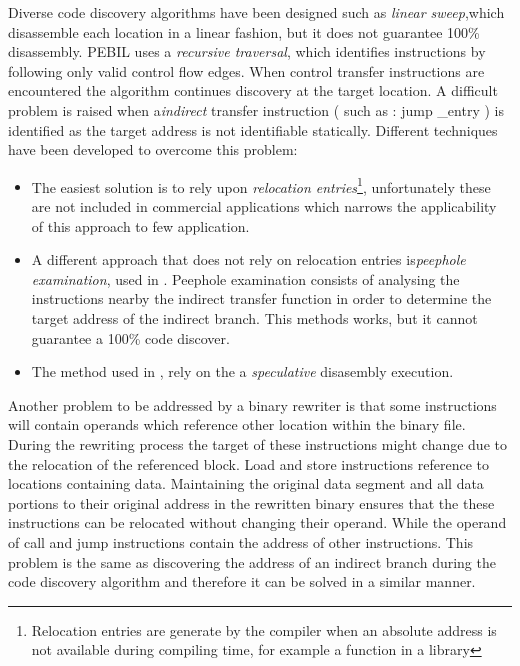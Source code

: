 Diverse code discovery algorithms have been designed \cite{SECONDWRITER , codediscovery} such as \emph{linear sweep},which disassemble each location in a linear fashion, but it does not guarantee 100\% disassembly. PEBIL uses a \emph{recursive traversal}, which identifies instructions by following only valid control flow edges. When control transfer instructions are encountered the algorithm continues discovery at the target location. A difficult problem is raised when a\emph{indirect} transfer instruction  ( such as : jump \_entry ) is identified as the target address is not identifiable statically. Different techniques have been developed to overcome this problem: 
\begin{itemize}
\item The easiest solution is to rely upon \emph{relocation entries}\footnote{Relocation entries are generate by the compiler when an absolute address is not available during compiling time, for example a function in a library}, unfortunately these are not included in commercial applications which narrows the applicability of this approach to few application. %

\item A different approach that does not rely on relocation entries is\emph{peephole examination},  used  in \cite{PEBIL}. Peephole examination consists of analysing the instructions nearby the indirect transfer function  in order to determine the target address of the indirect branch. This methods works, but it cannot guarantee a 100\% code discover. 

\item The method used in \cite{SECONDWRITER}, rely on the a \emph{speculative} disasembly execution.  
\end{itemize}       

Another problem to be addressed by a binary rewriter is that some instructions will contain operands which reference other location within the binary file. During the rewriting process the target of these instructions might change due to the relocation of the referenced block. Load and store instructions reference to locations containing data. Maintaining the original data segment and all data portions to their original address in the rewritten binary ensures that the these instructions can be relocated without changing their operand. While the operand of call and jump instructions contain the address of other instructions. This problem is the same as discovering the address of an indirect branch during the code discovery algorithm and therefore it can be solved in a similar manner.   

